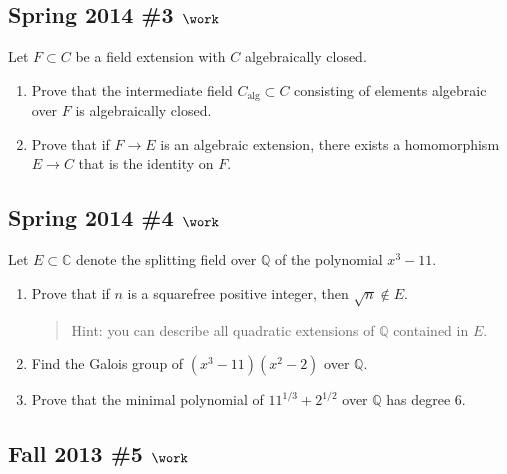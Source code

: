 \hypertarget{spring-2014-3-work}{%
\subsection{\texorpdfstring{Spring 2014 \#3
\(\work\)}{Spring 2014 \#3 \textbackslash work}}\label{spring-2014-3-work}}

Let \(F\subset C\) be a field extension with \(C\) algebraically closed.

\begin{enumerate}
\def\labelenumi{\alph{enumi}.}
\item
  Prove that the intermediate field \(C_{\text{alg}} \subset C\)
  consisting of elements algebraic over \(F\) is algebraically closed.
\item
  Prove that if \(F\to E\) is an algebraic extension, there exists a
  homomorphism \(E\to C\) that is the identity on \(F\).
\end{enumerate}

\hypertarget{spring-2014-4-work}{%
\subsection{\texorpdfstring{Spring 2014 \#4
\(\work\)}{Spring 2014 \#4 \textbackslash work}}\label{spring-2014-4-work}}

Let \(E\subset {\mathbb{C}}\) denote the splitting field over
\({\mathbb{Q}}\) of the polynomial \(x^3 - 11\).

\begin{enumerate}
\def\labelenumi{\alph{enumi}.}
\item
  Prove that if \(n\) is a squarefree positive integer, then
  \(\sqrt{n}\not\in E\).

  \begin{quote}
  Hint: you can describe all quadratic extensions of \({\mathbb{Q}}\)
  contained in \(E\).
  \end{quote}
\item
  Find the Galois group of \((x^3 - 11)(x^2 - 2)\) over
  \({\mathbb{Q}}\).
\item
  Prove that the minimal polynomial of \(11^{1/3} + 2^{1/2}\) over
  \({\mathbb{Q}}\) has degree 6.
\end{enumerate}

\hypertarget{fall-2013-5-work}{%
\subsection{\texorpdfstring{Fall 2013 \#5
\(\work\)}{Fall 2013 \#5 \textbackslash work}}\label{fall-2013-5-work}}

